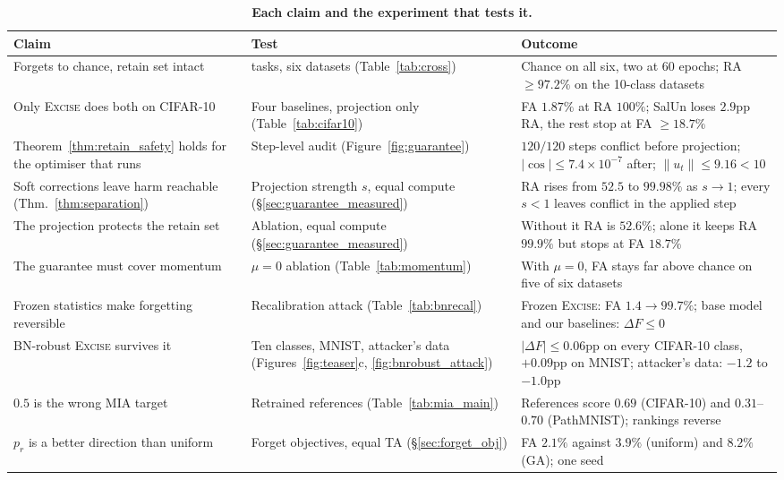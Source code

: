 \documentclass{article}
\newcommand{\ours}{\textsc{Excise}}
\newcommand{\rev}[1]{{\color{revisedB}#1}}
\theoremstyle{remark}
\theoremstyle{plain}
\begin{document}
\begin{table}[t]
\centering\color{revisedB}
\caption{\rev{\textbf{Each claim and the experiment that tests it.}}}
\label{tab:claims}
\small
\renewcommand{\arraystretch}{1.08}
\begin{tabular}{@{}>{\raggedright\arraybackslash}p{}>{\raggedright\arraybackslash}p{}>{\raggedright\arraybackslash}p{}@{}}
\toprule
\textbf{Claim} & \textbf{Test} & \textbf{Outcome} \\
\midrule
Forgets to chance, retain set intact & 31 tasks, six datasets (Table~\ref{tab:cross}) & Chance on all six, two at 60 epochs; RA $\ge 97.2\%$ on the 10-class datasets \\
Only \ours{} does both on CIFAR-10 & Four baselines, projection only (Table~\ref{tab:cifar10}) & FA $1.87\%$ at RA $100\%$; SalUn loses $2.9$pp RA, the rest stop at FA $\ge 18.7\%$ \\
Theorem~\ref{thm:retain_safety} holds for the optimiser that runs & Step-level audit (Figure~\ref{fig:guarantee}) & $120/120$ steps conflict before projection; $|\cos| \le 7.4\times10^{-7}$ after; $\|u_t\| \le 9.16 < 10$ \\
Soft corrections leave harm reachable (Thm.~\ref{thm:separation}) & Projection strength $s$, equal compute (\S\ref{sec:guarantee_measured}) & RA rises from $52.5$ to $99.98\%$ as $s \to 1$; every $s<1$ leaves conflict in the applied step \\
The projection protects the retain set & Ablation, equal compute (\S\ref{sec:guarantee_measured}) & Without it RA is $52.6\%$; alone it keeps RA $99.9\%$ but stops at FA $18.7\%$ \\
The guarantee must cover momentum & $\mu = 0$ ablation (Table~\ref{tab:momentum}) & With $\mu=0$, FA stays far above chance on five of six datasets \\
Frozen statistics make forgetting reversible & Recalibration attack (Table~\ref{tab:bnrecal}) & Frozen \ours{}: FA $1.4 \to 99.7\%$; base model and our baselines: $\Delta F \le 0$ \\
BN-robust \ours{} survives it & Ten classes, MNIST, attacker's data (Figures~\ref{fig:teaser}c, \ref{fig:bnrobust_attack}) & $|\Delta F| \le 0.06$pp on every CIFAR-10 class, $+0.09$pp on MNIST; attacker's data: $-1.2$ to $-1.0$pp \\
$0.5$ is the wrong MIA target & Retrained references (Table~\ref{tab:mia_main}) & References score $0.69$ (CIFAR-10) and $0.31$--$0.70$ (PathMNIST); rankings reverse \\
$p_r$ is a better direction than uniform & Forget objectives, equal TA (\S\ref{sec:forget_obj}) & FA $2.1\%$ against $3.9\%$ (uniform) and $8.2\%$ (GA); one seed \\
\bottomrule
\end{tabular}
\end{table}
\end{document}
